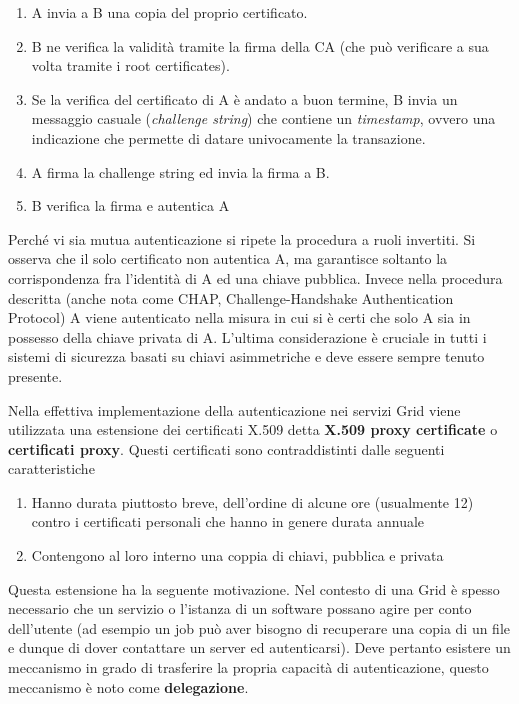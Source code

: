 \documentclass[italian,]{article}
\providecommand{\tightlist}{%
  \setlength{\itemsep}{0pt}\setlength{\parskip}{0pt}}
\begin{document}
\begin{enumerate}
\def\labelenumi{\arabic{enumi}.}
\tightlist
\item
  A invia a B una copia del proprio certificato.
\item
  B ne verifica la validità tramite la firma della CA (che può
  verificare a sua volta tramite i root certificates).
\item
  Se la verifica del certificato di A è andato a buon termine, B invia
  un messaggio casuale (\emph{challenge string}) che contiene un
  \emph{timestamp}, ovvero una indicazione che permette di datare
  univocamente la transazione.
\item
  A firma la challenge string ed invia la firma a B.
\item
  B verifica la firma e autentica A
\end{enumerate}

Perché vi sia mutua autenticazione si ripete la procedura a ruoli
invertiti. Si osserva che il solo certificato non autentica A, ma
garantisce soltanto la corrispondenza fra l'identità di A ed una chiave
pubblica. Invece nella procedura descritta (anche nota come CHAP,
Challenge-Handshake Authentication Protocol) A viene autenticato nella
misura in cui si è certi che solo A sia in possesso della chiave privata
di A. L'ultima considerazione è cruciale in tutti i sistemi di sicurezza
basati su chiavi asimmetriche e deve essere sempre tenuto presente.

Nella effettiva implementazione della autenticazione nei servizi Grid
viene utilizzata una estensione dei certificati X.509 detta
\textbf{X.509 proxy certificate} o \textbf{certificati proxy}. Questi
certificati sono contraddistinti dalle seguenti caratteristiche

\begin{enumerate}
\def\labelenumi{\arabic{enumi}.}
\tightlist
\item
  Hanno durata piuttosto breve, dell'ordine di alcune ore (usualmente
  12) contro i certificati personali che hanno in genere durata annuale
\item
  Contengono al loro interno una coppia di chiavi, pubblica e privata
\end{enumerate}

Questa estensione ha la seguente motivazione. Nel contesto di una Grid è
spesso necessario che un servizio o l'istanza di un software possano
agire per conto dell'utente (ad esempio un job può aver bisogno di
recuperare una copia di un file e dunque di dover contattare un server
ed autenticarsi). Deve pertanto esistere un meccanismo in grado di
trasferire la propria capacità di autenticazione, questo meccanismo è
noto come \textbf{delegazione}.
\end{document}
